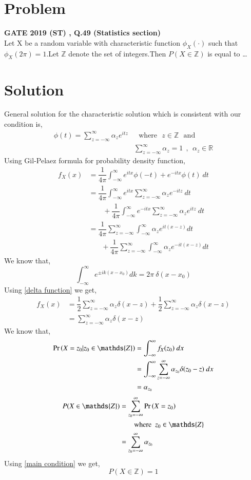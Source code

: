 \documentclass[journal,12pt,twocolumn]{IEEEtran}
\begin{document}
\section{Problem}
\textbf{GATE 2019 (ST) , Q.49 (Statistics section)}\\
   Let X be a random variable with characteristic function $\phi_X(\cdot)$ such that $\phi_X(2 \pi)=1$.Let $\mathds{Z}$ denote the set of integers.Then $P(X \in \mathds{Z})$ is equal to \ldots
\section{Solution}
  General solution for the characteristic solution which is consistent with our condition is,
  \begin{align}
      \phi(t)=\sum_{z=-\infty}^{\infty}\alpha_ze^{itz}& \text{~~where~~} z \in \mathds{Z} \text{~~and}\\
      &\sum_{z=-\infty}^{\infty}\alpha_z=1~~,~~\alpha_z \in \mathds{R} \label{main condition}
  \end{align}
  Using Gil-Pelaez formula for probability density function,
  \begin{align}
      f_X(x)&=\dfrac{1}{4\pi}\int_{-\infty}^\infty e^{itx}\phi(-t)+e^{-itx}\phi(t)~dt\\
      &=\dfrac{1}{4\pi}\int_{-\infty}^\infty e^{itx}\sum_{z=-\infty}^{\infty}\alpha_ze^{-itz} ~dt\nonumber\\&~~~~~~~~~+\dfrac{1}{4\pi}\int_{-\infty}^\infty e^{-itx}\sum_{z=-\infty}^{\infty}\alpha_ze^{itz}~dt\\
      &=\dfrac{1}{4\pi}\sum_{z=-\infty}^{\infty}\int_{-\infty}^\infty\alpha_ze^{it(x-z)}dt\nonumber\\&~~~~~~~~+\dfrac{1}{4\pi}\sum_{z=-\infty}^{\infty}\int_{-\infty}^\infty\alpha_ze^{-it(x-z)}dt
\end{align}
We know that,
\begin{equation}
    \int_{-\infty}^{\infty}e^{\pm ik(x-x_{0})}dk=2\pi~\delta(x-x_{0}) \label{delta function}
\end{equation}
Using \eqref{delta function} we get,
\begin{align}
     f_X(x) &=\dfrac{1}{2}\sum_{z=-\infty}^{\infty}\alpha_z \delta(x-z)+\dfrac{1}{2}\sum_{z=-\infty}^{\infty}\alpha_z \delta(x-z)\\
     &=\sum_{z=-\infty}^{\infty}\alpha_z \delta(x-z)
\end{align}
  We know that,
  \begin{align}
      \pr{X=z_0|z_0 \in \mathds{Z}}&=\int_{-\infty}^{\infty} f_X(z_0)~dx\\
      &=\int_{-\infty}^{\infty}\sum_{z=-\infty}^{\infty}\alpha_{z_0}\delta(z_0-z)~dx\\
      &=\alpha_{z_0}
  \end{align}
  \begin{align}
      P(X \in \mathds{Z})&=\sum_{z_0=-\infty}^{\infty}\pr{X=z_0}\nonumber\\&~~~~~~~~\text{where~~} z_0 \in \mathds{Z}\\
      &=\sum_{z_0=-\infty}^{\infty}\alpha_{z_0}
  \end{align}
  Using \eqref{main condition} we get,
  $$ P(X \in \mathds{Z})=1$$
\end{document}
